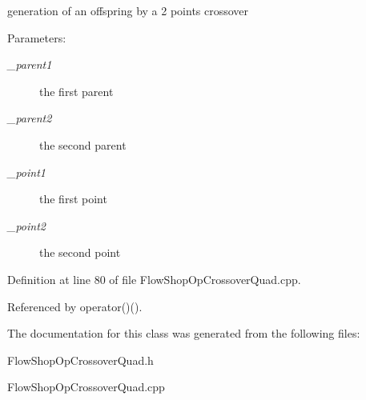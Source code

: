 generation of an offspring by a 2 points crossover 

\begin{Desc}
\item[Parameters:]
\begin{description}
\item[{\em \_\-parent1}]the first parent \item[{\em \_\-parent2}]the second parent \item[{\em \_\-point1}]the first point \item[{\em \_\-point2}]the second point \end{description}
\end{Desc}


Definition at line 80 of file Flow\-Shop\-Op\-Crossover\-Quad.cpp.

Referenced by operator()().

The documentation for this class was generated from the following files:\begin{CompactItemize}
\item 
Flow\-Shop\-Op\-Crossover\-Quad.h\item 
Flow\-Shop\-Op\-Crossover\-Quad.cpp\end{CompactItemize}
